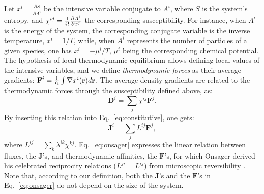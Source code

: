 Let $x^i=\frac{\partial S}{\partial A^i}$ be the intensive variable conjugate to $A^i$, where $S$ is the system's entropy, and $\chi^{ij} = \frac{1}{{\mathrm\Omega}} \frac{\partial A^i}{\partial x^j}$ the corresponding susceptibility. For instance, when $A^i$ is the energy of the system, the corresponding conjugate variable is the inverse temperature, $x^i=1/T$, while, when $A^i$ represents the number of particles of a given species, one has $x^i= - \mu^i/T$, $\mu^i$ being the corresponding chemical potential. The hypothesis of local thermodynamic equilibrium allows defining local values of the intensive variables, and we define \emph{thermodynamic forces} as their average gradients: $\mathbf{F}^i= \frac{1}{{\mathrm\Omega}} \int \nabla x^i(\mathbf{r})d\mathbf{r}$. The average density gradients are related to the thermodynamic forces through the susceptibility defined above, as:
\begin{equation}
\mathbf{D}^i=\sum_j\chi^{ij}\mathbf{F}^j .
\end{equation}
By inserting this relation into Eq.~\eqref{eq:constitutive}, one gets:
\begin{equation}
\mathbf{J}^i=\sum_j L^{ij} \mathbf{F}^j, \label{eq:onsager}
\end{equation}
where $L^{ij}=\sum_k\lambda^{ik}\chi^{kj}$. Eq.~\eqref{eq:onsager} expresses the linear relation between fluxes, the $\mathbf{J}$'s, and thermodynamic affinities, the $\mathbf{F}$'s, for which Onsager derived his celebrated reciprocity relations ($L^{ji}=L^{ij}$) from microscopic reversibility \citep{Onsager1931a,Onsager1931b,Casimir1945}. Note that, according to our definition, both the $\mathbf{J}$'s and the $\mathbf{F}$'s in Eq.~\eqref{eq:onsager} do not depend on the size of the system.



